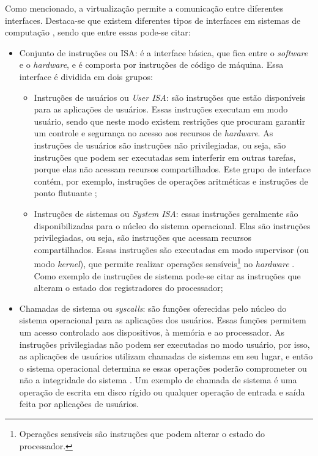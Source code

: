 Como mencionado, a virtualização permite a comunicação entre diferentes interfaces. Destaca-se que existem diferentes tipos de interfaces
em sistemas de computação \cite{maziero2013}, sendo que entre essas pode-se citar:
\begin{itemize}
 \item Conjunto de instruções ou \ac{ISA}: é a interface básica, que fica entre o \textit{software} e o \textit{hardware}, e é composta por 
 instruções de código de máquina. Essa interface é dividida em dois grupos:
 \begin{itemize}
  \item Instruções de usuários ou \textit{User \ac{ISA}}: são instruções que estão disponíveis para as aplicações de usuários. Essas instruções 
  executam em modo usuário, sendo que neste modo existem restrições que procuram garantir um controle e segurança no acesso aos recursos de 
  \textit{hardware}. As instruções de usuários são instruções não privilegiadas, ou seja, são instruções que podem ser executadas sem interferir 
  em outras tarefas, porque elas não acessam recursos compartilhados. Este grupo de interface contém, por exemplo, instruções de operações 
  aritméticas e instruções de ponto flutuante \cite{buyya2013};
  \item Instruções de sistemas ou \textit{System \ac{ISA}}: essas instruções geralmente são disponibilizadas para o núcleo do sistema operacional. 
  Elas são instruções privilegiadas, ou seja, são instruções que acessam recursos compartilhados. Essas instruções são executadas em modo 
  supervisor (ou modo \textit{kernel}), que permite realizar operações sensíveis\footnote[1]{Operações sensíveis são instruções que podem alterar o 
  estado do processador.} no \textit{hardware} \cite{buyya2013}. Como exemplo de instruções de sistema pode-se citar as instruções que alteram 
  o estado dos registradores do processador; %
 \end{itemize}
 \item Chamadas de sistema ou \textit{syscalls}: são funções oferecidas pelo núcleo do sistema operacional para as aplicações dos usuários.
 Essas funções permitem um acesso controlado aos dispositivos, à memória e ao processador. 
 As instruções privilegiadas não podem ser executadas no modo usuário, por isso, as aplicações de usuários utilizam chamadas de sistemas em seu 
 lugar, e então o sistema operacional determina se essas operações poderão comprometer ou não a integridade do sistema \cite{marinescu2013}.
 Um exemplo de chamada de sistema é uma operação de escrita em disco rígido ou qualquer operação de entrada e saída feita por aplicações de usuários.
\end{itemize}

